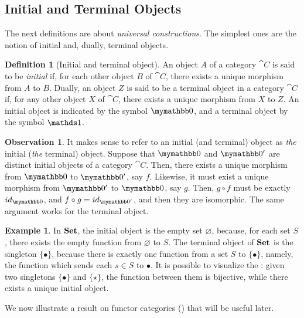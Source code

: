 \documentclass[a4paper, twoside,openright]{report}
\theoremstyle{plain}
\theoremstyle{definition}
\newtheorem{definition}[theorem]{Definition}
\newtheorem{example}[theorem]{Example}
\newtheorem{obs}[theorem]{Observation}
\begin{document}
\subsection{Initial and Terminal Objects}

The next definitions are about \emph{universal constructions}. The simplest ones are the notion of initial and, dually, terminal objects.

\begin{definition}[Initial and terminal object]
    An object $A$ of a category $\cat C$ is said to be \emph{initial} if, for each other object $B$ of $\cat C$, there exists a unique morphism from $A$ to $B$.
    Dually, an object $Z$ is said to be a terminal object in a category $\cat C$ if, for any other object $X$ of $\cat C$, there exists a unique morphism from $X$ to $Z$.
    An initial object is indicated by the symbol $\initial$, and a terminal object by the symbol $\terminal$.
\end{definition}

\begin{obs}\label{obs:terminal_are_isomorph}
    It makes sense to refer to an initial (and terminal) object as \emph{the} initial (\emph{the} terminal) object. Suppose that $\initial$ and $\initial'$ are distinct initial objects of a category $\cat C$. Then, there exists a unique morphism from $\initial$ to $\initial'$, say $f$. Likewise, it must exist a unique morphism from $\initial'$ to $\initial$, say $g$. Then, $g\circ f$ must be exactly $id_{\initial}$, and $f \circ g = id_{\initial'}$, and then they are isomorphic. The same argument works for the terminal object.
\end{obs}

\begin{example}\label{ex:set_init_term}
    In $\mathbf{Set}$, the initial object is the empty set $\varnothing$, because, for each set $S$, there exists the empty function from $\varnothing$ to $S$. The terminal object of $\mathbf{Set}$ is the singleton $\{ \bullet \}$, because there is exactly one function from a set $S$ to $\{ \bullet \}$, namely, the function which sends each $s \in S$ to $\bullet$. It is possible to visualize the : given two singletons $\{ \bullet \}$ and $\{ \star \}$, the function between them is bijective, while there exists a unique initial object.
\end{example}

We now illustrate a result on functor categories () that will be useful later.
\end{document}
